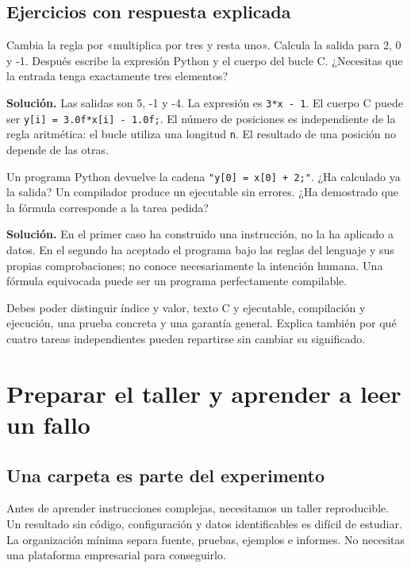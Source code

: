 \documentclass[12pt,a4paper,oneside]{report}
\begin{document}
\section{Ejercicios con respuesta explicada}
\begin{practica}
Cambia la regla por «multiplica por tres y resta uno». Calcula la salida para 2, 0 y -1. Después escribe la expresión Python y el cuerpo del bucle C. ¿Necesitas que la entrada tenga exactamente tres elementos?

\end{practica}
\textbf{Solución.} Las salidas son 5, -1 y -4. La expresión es \texttt{3*x - 1}. El cuerpo C puede ser \texttt{y[i] = 3.0f*\allowbreak{}x[i] - 1.0f;}. El número de posiciones es independiente de la regla aritmética: el bucle utiliza una longitud \texttt{n}. El resultado de una posición no depende de las otras.

\begin{practica}
Un programa Python devuelve la cadena \texttt{"y[0] = x[0] + 2;"}. ¿Ha calculado ya la salida? Un compilador produce un ejecutable sin errores. ¿Ha demostrado que la fórmula corresponde a la tarea pedida?

\end{practica}
\textbf{Solución.} En el primer caso ha construido una instrucción, no la ha aplicado a datos. En el segundo ha aceptado el programa bajo las reglas del lenguaje y sus propias comprobaciones; no conoce necesariamente la intención humana. Una fórmula equivocada puede ser un programa perfectamente compilable.

\begin{comprueba}
Debes poder distinguir índice y valor, texto C y ejecutable, compilación y ejecución, una prueba concreta y una garantía general. Explica también por qué cuatro tareas independientes pueden repartirse sin cambiar su significado.

\end{comprueba}
\chapter{Preparar el taller y aprender a leer un fallo}
\label{ch:taller}
\section{Una carpeta es parte del experimento}
Antes de aprender instrucciones complejas, necesitamos un taller reproducible. Un resultado sin código, configuración y datos identificables es difícil de estudiar. La organización mínima separa fuente, pruebas, ejemplos e informes. No necesitas una plataforma empresarial para conseguirlo.
\end{document}
